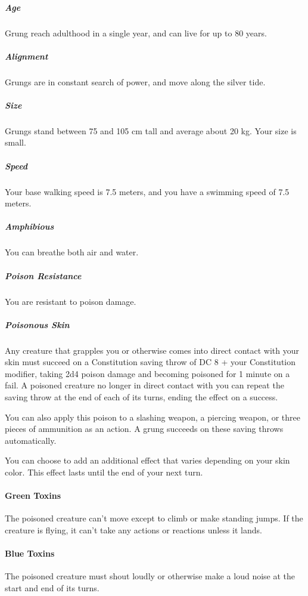     \subparagraph{Age} Grung reach adulthood in a single year, and can live for up to 80 years.

    \subparagraph{Alignment} %
    Grungs are in constant search of power, and move along the silver tide.

    \subparagraph{Size} Grungs stand between 75 and 105 cm tall and average about 20 kg.
    Your size is small.

    \subparagraph{Speed} Your base walking speed is 7.5 meters, and you have a swimming speed of 7.5 meters.

    \subparagraph{Amphibious} You can breathe both air and water.

    \subparagraph{Poison Resistance} You are resistant to poison damage.

    \subparagraph{Poisonous Skin} Any creature that grapples you or otherwise comes into direct contact with your skin must succeed on a Constitution saving throw of DC 8 + your Constitution modifier, taking 2d4 poison damage and becoming poisoned for 1 minute on a fail.
    A poisoned creature no longer in direct contact with you can repeat the saving throw at the end of each of its turns, ending the effect on a success.

    You can also apply this poison to a slashing weapon, a piercing weapon, or three pieces of ammunition as an action.
    A grung succeeds on these saving throws automatically.

    You can choose to add an additional effect that varies depending on your skin color.
    This effect lasts until the end of your next turn.

        \paragraph{Green Toxins} The poisoned creature can't move except to climb or make standing jumps.
        If the creature is flying, it can't take any actions or reactions unless it lands.

        \paragraph{Blue Toxins} The poisoned creature must shout loudly or otherwise make a loud noise at the start and end of its turns.

